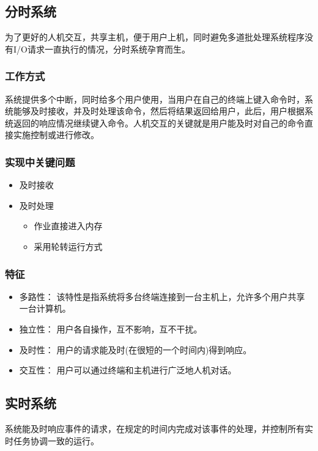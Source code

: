 \documentclass[]{scrartcl}
\begin{document}
	\subsection{分时系统}
	\quad
	
	为了更好的人机交互，共享主机，便于用户上机，同时避免多道批处理系统程序没有I/O请求一直执行的情况，分时系统孕育而生。
	
		\subsubsection{工作方式}
		系统提供多个中断，同时给多个用户使用，当用户在自己的终端上键入命令时，系统能够及时接收，并及时处理该命令，然后将结果返回给用户，此后，用户根据系统返回的响应情况继续键入命令。人机交互的关键就是用户能及时对自己的命令直接实施控制或进行修改。
		\subsubsection{实现中关键问题}
		\begin{itemize}
			\item 及时接收
			\item 及时处理
			\begin{itemize}
				\item 作业直接进入内存
				\item 采用轮转运行方式
			\end{itemize}
		\end{itemize}
		\subsubsection{特征}
		\begin{itemize}
			\item 多路性：  
			该特性是指系统将多台终端连接到一台主机上，允许多个用户共享一台计算机。
			\item 独立性：  
			用户各自操作，互不影响，互不干扰。
			\item 及时性：  
			用户的请求能及时(在很短的一个时间内)得到响应。
			\item 交互性：  
			用户可以通过终端和主机进行广泛地人机对话。
		\end{itemize}
	\subsection{实时系统}
	\quad

	系统能及时响应事件的请求，在规定的时间内完成对该事件的处理，并控制所有实时任务协调一致的运行。
	
\end{document}
